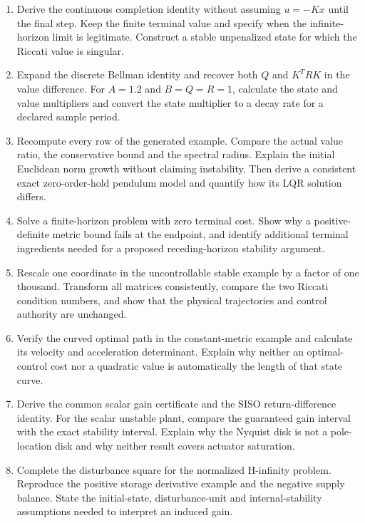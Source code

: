 \begin{enumerate}
\item Derive the continuous completion identity without assuming $u=-Kx$ until the final step. Keep the finite terminal value and specify when the infinite-horizon limit is legitimate. Construct a stable unpenalized state for which the Riccati value is singular.

\item Expand the discrete Bellman identity and recover both $Q$ and $K^TRK$ in the value difference. For $A=1.2$ and $B=Q=R=1$, calculate the state and value multipliers and convert the state multiplier to a decay rate for a declared sample period.

\item Recompute every row of the generated example. Compare the actual value ratio, the conservative bound and the spectral radius. Explain the initial Euclidean norm growth without claiming instability. Then derive a consistent exact zero-order-hold pendulum model and quantify how its LQR solution differs.

\item Solve a finite-horizon problem with zero terminal cost. Show why a positive-definite metric bound fails at the endpoint, and identify additional terminal ingredients needed for a proposed receding-horizon stability argument.

\item Rescale one coordinate in the uncontrollable stable example by a factor of one thousand. Transform all matrices consistently, compare the two Riccati condition numbers, and show that the physical trajectories and control authority are unchanged.

\item Verify the curved optimal path in the constant-metric example and calculate its velocity and acceleration determinant. Explain why neither an optimal-control cost nor a quadratic value is automatically the length of that state curve.

\item Derive the common scalar gain certificate and the SISO return-difference identity. For the scalar unstable plant, compare the guaranteed gain interval with the exact stability interval. Explain why the Nyquist disk is not a pole-location disk and why neither result covers actuator saturation.

\item Complete the disturbance square for the normalized H-infinity problem. Reproduce the positive storage derivative example and the negative supply balance. State the initial-state, disturbance-unit and internal-stability assumptions needed to interpret an induced gain.


\end{enumerate}
